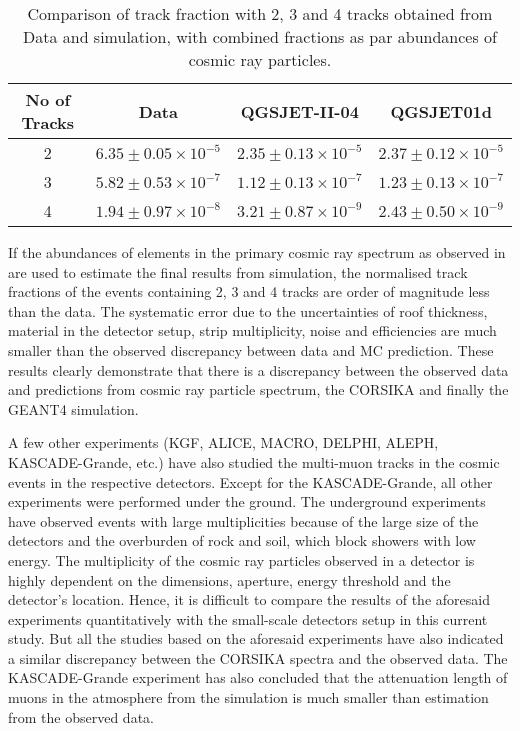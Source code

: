 \begin{table}[btbp]
  \centering
\begin{tabular}{|c|ccc|} \hline
No of Tracks &  Data &   QGSJET-II-04     &  QGSJET01d \\ \hline
    2         & $6.35\pm 0.05\times 10^{-5}$ & $2.35\pm 0.13\times 10^{-5}$ & $2.37\pm 0.12\times 10^{-5}$ \\
    3         & $5.82\pm 0.53\times 10^{-7}$ & $1.12\pm 0.13\times 10^{-7}$ & $1.23\pm 0.13\times 10^{-7}$ \\
    4         & $1.94\pm 0.97\times 10^{-8}$ & $3.21\pm 0.87\times 10^{-9}$ & $2.43\pm 0.50\times 10^{-9}$ \\ \hline
\end{tabular}
\caption{Comparison of track fraction with 2, 3 and 4 tracks
  obtained from Data and simulation, with combined fractions
  as par abundances of cosmic ray particles.}\label{tab:ratio2}
\end{table}

If the abundances of elements in the primary cosmic ray spectrum as
observed in \cite{cosmic1,pdgspectra1} are used to estimate the final
results from simulation, the normalised track fractions of the events
containing 2, 3 and 4 tracks are order of magnitude less than
the data. The systematic error due to the uncertainties of roof
thickness, material in the detector setup, strip multiplicity, noise
and efficiencies are much smaller than the observed discrepancy
between data and MC prediction. These results clearly demonstrate
that there is a discrepancy between the observed data and 
predictions from cosmic ray particle spectrum, the CORSIKA and
finally the GEANT4 simulation.

A few other experiments (KGF\cite{kgf1}, ALICE\cite{alice1},
MACRO\cite{macro1}, DELPHI\cite{delphi1}, ALEPH\cite{aleph1},
KASCADE-Grande\cite{kascade1}, etc.) have also studied the multi-muon
tracks in the cosmic events in the respective detectors. Except for
the KASCADE-Grande, all other experiments were performed under
the ground. The underground experiments have observed events with
large multiplicities because of the large size of the detectors and
the overburden of rock and soil, which block showers with low energy.
The multiplicity of the cosmic ray particles observed in a detector
is highly dependent on the dimensions, aperture, energy threshold
and the detector's location. Hence, it is difficult to compare the
results of the aforesaid experiments quantitatively with the
small-scale detectors setup in this current study. But all
the studies based on the aforesaid experiments have also indicated
a similar discrepancy between the CORSIKA spectra and the observed
data. The KASCADE-Grande experiment has also concluded that the
attenuation length of muons in the atmosphere from the simulation
is much smaller than estimation from the observed data\cite{kascade1}.

